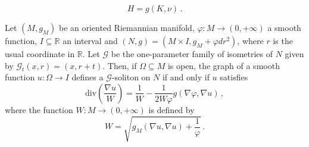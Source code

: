 \documentclass[10pt,a4paper]{amsart}
\newcommand{\R}{\mathbb{R}}
\begin{document}
\begin{equation}\label{eq:mcf3}
    H = g \left( K , \nu \right) \, .
\end{equation}

\begin{theorem}\label{thm:pde}
Let $(M,g_M)$ be an oriented Riemannian manifold, $\varphi \colon M \to (0,+\infty)$ a smooth function, $I \subseteq \R$ an interval and $(N,g) = (M \times I , g_M + \varphi dr^2)$, where $r$ is the usual coordinate in $\R$. Let $\mathcal{G}$ be the one-parameter family of isometries of $N$ given by $\mathcal{G}_t (x,r) = (x , r+t)$. Then, if $\Omega \subseteq M$ is open, the graph of a smooth function $u \colon \Omega \to I$ defines a $\mathcal{G}$-soliton on $N$ if and only if $u$ satisfies
\begin{equation}\label{eq:pde}
    \mathrm{div}\left(\frac{\nabla u}{W}\right)=\frac{1}{W}-\frac{1}{2W\varphi}g(\nabla \varphi,\nabla u) \, ,
\end{equation}
where the function $W \colon M \to (0,+\infty)$ is defined by
\begin{equation}\label{eq:defW}
    W = \sqrt{g_M(\nabla u , \nabla u) + \frac{1}{\varphi}} \, .
\end{equation}
\end{theorem}
\end{document}
